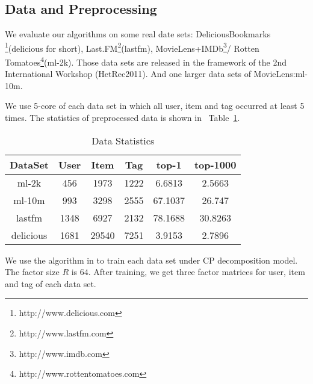 \documentclass[letterpaper]{article}
\newcommand{\Table}[1] {Table~\ref{table:#1}}
\begin{document}
\subsection{Data and Preprocessing}
We evaluate our algorithms on some real date sets:
DeliciousBookmarks
\footnote{http://www.delicious.com}(delicious for short),
Last.FM\footnote{http://www.lastfm.com}(lastfm),
MovieLens+IMDb\footnote{http://www.imdb.com }/
Rotten Tomatoes\footnote{http://www.rottentomatoes.com}(ml-2k).
Those data sets are released in the framework of the 2nd International Workshop (HetRec2011).
And one larger data sets of MovieLens\cite{Harper2015}:ml-10m.

We use 5-core of each data set in which all user, item and tag occurred at least 5 times.
The statistics of preprocessed data is shown in ~\Table{Data}.
\begin{table}[t]
  \centering
  \begin{tabular}{|c|c|c|c|c|c|}
    \hline
    DataSet     & User & Item    & Tag    & top-1   & top-1000\\
    \hline
    ml-2k       & 456  &  1973   &  1222  & 6.6813  & 2.5663 \\
    ml-10m      & 993  &  3298   &  2555  & 67.1037 & 26.747 \\
    lastfm      & 1348 &  6927   &  2132  & 78.1688 & 30.8263\\
    delicious   & 1681 &  29540  &  7251  & 3.9153  & 2.7896 \\
    \hline
  \end{tabular}
  \caption{Data Statistics}
  \label{table:Data}
\end{table}
We use the algorithm in \cite{Rendle_RTF} to train each data set under CP decomposition model.
The factor size $R$ is $64$.
After training, we get three factor matrices for user, item and tag of each data set.
\end{document}
